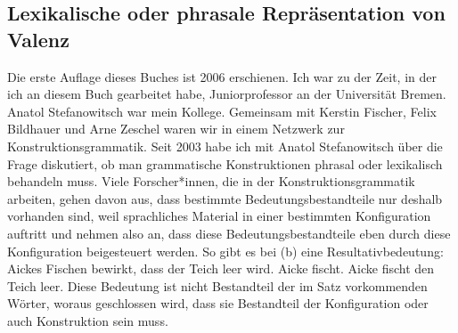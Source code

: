 \subsection{Lexikalische oder phrasale Repräsentation von Valenz}
\label{Abschnitt-phrasale-Valenz}

Die erste Auflage dieses Buches ist 2006 erschienen. Ich war zu der Zeit, in der ich an diesem Buch
gearbeitet habe, Juniorprofessor an der Universität Bremen. Anatol Stefanowitsch war mein
Kollege. Gemeinsam mit Kerstin Fischer, Felix Bildhauer und Arne Zeschel waren wir in einem Netzwerk
zur Konstruktionsgrammatik. Seit 2003 habe ich mit Anatol Stefanowitsch über die Frage diskutiert,
ob man grammatische Konstruktionen phrasal oder lexikalisch behandeln muss. Viele Forscher*innen,
die in der Konstruktionsgrammatik arbeiten, gehen davon aus, dass bestimmte Bedeutungsbestandteile
nur deshalb vorhanden sind, weil sprachliches Material in einer bestimmten Konfiguration auftritt
und nehmen also an, dass diese Bedeutungsbestandteile eben durch diese Konfiguration beigesteuert
werden. So gibt es bei (b) eine Resultativbedeutung: Aickes Fischen bewirkt, dass der Teich
leer wird.
\eal
\ex Aicke fischt.
\ex Aicke fischt den Teich leer.
\zl
Diese Bedeutung ist nicht Bestandteil der im Satz vorkommenden Wörter, woraus geschlossen wird, dass
sie Bestandteil der Konfiguration oder auch Konstruktion sein muss.

